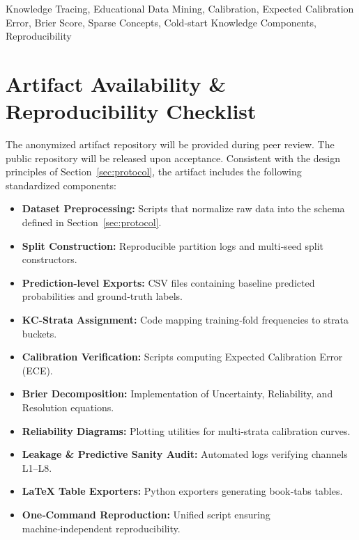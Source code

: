 \documentclass[conference]{IEEEtran}
\begin{document}
\begin{IEEEkeywords}
Knowledge Tracing, Educational Data Mining, Calibration, Expected Calibration Error, Brier Score, Sparse Concepts, Cold‑start Knowledge Components, Reproducibility
\end{IEEEkeywords}








\section*{Artifact Availability \& Reproducibility Checklist}
The anonymized artifact repository will be provided during peer review. The public repository will be released upon acceptance. Consistent with the design principles of Section~\ref{sec:protocol}, the artifact includes the following standardized components:
\begin{itemize}
  \item \textbf{Dataset Preprocessing:} Scripts that normalize raw data into the schema defined in Section~\ref{sec:protocol}.
  \item \textbf{Split Construction:} Reproducible partition logs and multi‑seed split constructors.
  \item \textbf{Prediction‑level Exports:} CSV files containing baseline predicted probabilities and ground‑truth labels.
  \item \textbf{KC‑Strata Assignment:} Code mapping training‑fold frequencies to strata buckets.
  \item \textbf{Calibration Verification:} Scripts computing Expected Calibration Error (ECE).
  \item \textbf{Brier Decomposition:} Implementation of Uncertainty, Reliability, and Resolution equations.
  \item \textbf{Reliability Diagrams:} Plotting utilities for multi‑strata calibration curves.
  \item \textbf{Leakage \& Predictive Sanity Audit:} Automated logs verifying channels L1--L8.
  \item \textbf{LaTeX Table Exporters:} Python exporters generating book‑tabs tables.
  \item \textbf{One‑Command Reproduction:} Unified script ensuring machine‑independent reproducibility.
\end{itemize}

\appendices




\end{document}
